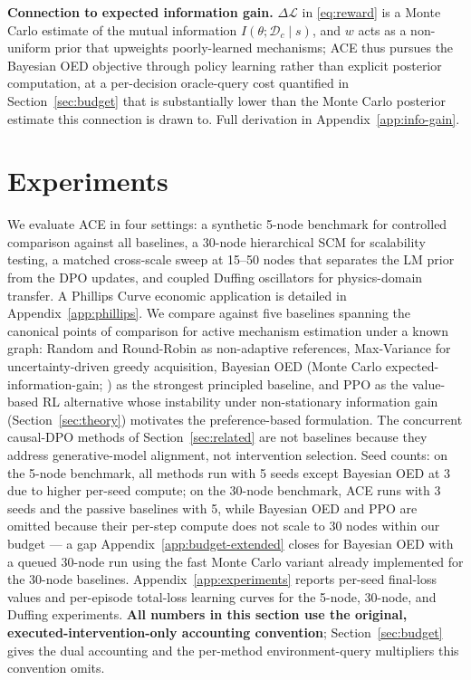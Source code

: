 \documentclass{article}
\theoremstyle{plain}
\theoremstyle{definition}
\theoremstyle{remark}
\begin{document}
\textbf{Connection to expected information gain.} $\Delta\mathcal{L}$ in \eqref{eq:reward} is a Monte Carlo estimate of the mutual information $I(\theta; \mathcal{D}_c \mid s)$, and $w$ acts as a non-uniform prior that upweights poorly-learned mechanisms; ACE thus pursues the Bayesian OED objective \citep{toth2022active} through policy learning rather than explicit posterior computation, at a per-decision oracle-query cost quantified in Section~\ref{sec:budget} that is substantially lower than the Monte Carlo posterior estimate this connection is drawn to. Full derivation in Appendix~\ref{app:info-gain}.

\section{Experiments}
\label{sec:results}

We evaluate ACE in four settings: a synthetic 5-node benchmark for controlled comparison against all baselines, a 30-node hierarchical SCM for scalability testing, a matched cross-scale sweep at 15--50 nodes that separates the LM prior from the DPO updates, and coupled Duffing oscillators for physics-domain transfer. A Phillips Curve economic application is detailed in Appendix~\ref{app:phillips}. We compare against five baselines spanning the canonical points of comparison for active mechanism estimation under a known graph: Random and Round-Robin \citep{fisher1935design} as non-adaptive references, Max-Variance \citep{cohn1996active,gal2016dropout} for uncertainty-driven greedy acquisition, Bayesian OED (Monte Carlo expected-information-gain; \citealp{toth2022active,tigas2022interventions,zhou2024sample}) as the strongest principled baseline, and PPO \citep{schulman2017proximal} as the value-based RL alternative whose instability under non-stationary information gain (Section~\ref{sec:theory}) motivates the preference-based formulation. The concurrent causal-DPO methods of Section~\ref{sec:related} \citep{hu2026capo,le2026cdpo} are not baselines because they address generative-model alignment, not intervention selection. Seed counts: on the 5-node benchmark, all methods run with 5 seeds except Bayesian OED at 3 due to higher per-seed compute; on the 30-node benchmark, ACE runs with 3 seeds and the passive baselines with 5, while Bayesian OED and PPO are omitted because their per-step compute does not scale to 30 nodes within our budget --- a gap Appendix~\ref{app:budget-extended} closes for Bayesian OED with a queued 30-node run using the fast Monte Carlo variant already implemented for the 30-node baselines. Appendix~\ref{app:experiments} reports per-seed final-loss values and per-episode total-loss learning curves for the 5-node, 30-node, and Duffing experiments. \textbf{All numbers in this section use the original, executed-intervention-only accounting convention}; Section~\ref{sec:budget} gives the dual accounting and the per-method environment-query multipliers this convention omits.
\end{document}
